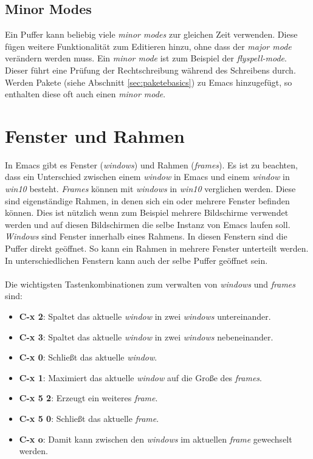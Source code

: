 \subsection{Minor Modes}
Ein Puffer kann beliebig viele \textit{minor modes} zur gleichen Zeit
verwenden. Diese fügen weitere Funktionalität zum Editieren hinzu,
ohne dass der \textit{major mode} verändern werden muss. Ein
\textit{minor mode} ist zum Beispiel der
\textit{flyspell-mode}. Dieser führt eine Prüfung der Rechtschreibung
während des Schreibens durch. Werden Pakete (siehe Abschnitt
\ref{sec:paketebasics}) zu Emacs hinzugefügt, so enthalten diese oft
auch einen \textit{minor mode}. \cite{EmacsManual}\\

\section{Fenster und Rahmen}
In Emacs gibt es Fenster (\textit{windows}) und Rahmen
(\textit{frames}). Es ist zu beachten, dass ein Unterschied zwischen
einem \textit{window} in Emacs und einem \textit{window} in
\textit{win10} besteht. \textit{Frames} können mit \textit{windows} in
\textit{win10} verglichen werden. Diese sind eigenständige Rahmen, in
denen sich ein oder mehrere Fenster befinden können. Dies ist nützlich
wenn zum Beispiel mehrere Bildschirme verwendet werden und auf diesen
Bildschirmen die selbe Instanz von Emacs laufen soll. \textit{Windows}
sind Fenster innerhalb eines Rahmens. In diesen Fenstern sind die
Puffer direkt geöffnet. So kann ein Rahmen in mehrere Fenster
unterteilt werden. In unterschiedlichen Fenstern kann auch der selbe
Puffer geöffnet sein. \cite{EmacsManual}\\\\ Die wichtigsten
Tastenkombinationen zum verwalten von \textit{windows} und
\textit{frames} sind:
\begin{itemize}
\item \textbf{C-x 2}: Spaltet das aktuelle \textit{window} in zwei
  \textit{windows} untereinander.
\item \textbf{C-x 3}: Spaltet das aktuelle \textit{window} in zwei
  \textit{windows} nebeneinander.
\item \textbf{C-x 0}: Schließt das aktuelle \textit{window}.
\item \textbf{C-x 1}: Maximiert das aktuelle \textit{window} auf die
  Große des \textit{frames}.
\item \textbf{C-x 5 2}: Erzeugt ein weiteres \textit{frame}.
\item \textbf{C-x 5 0}: Schließt das aktuelle \textit{frame}.
\item \textbf{C-x o}: Damit kann zwischen den \textit{windows} im
  aktuellen \textit{frame} gewechselt werden.\\
\end{itemize}

